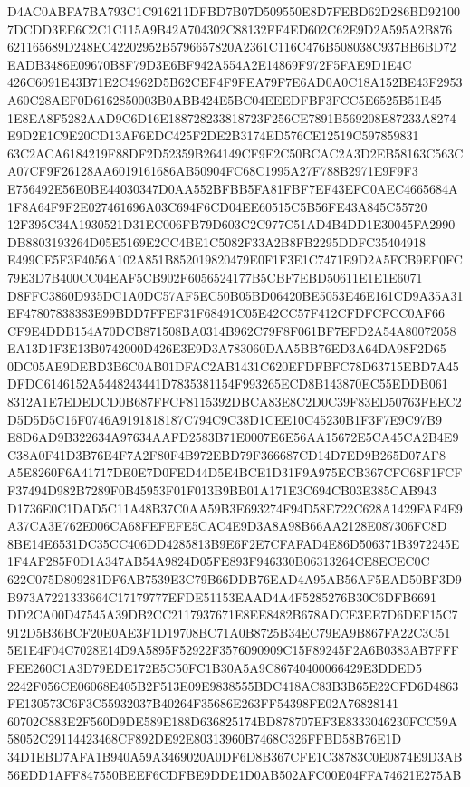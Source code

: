 \documentclass[UTF8,fontset=fandol,zihao=-4,a4paper]{ctexart}
\begin{document}
{{D4AC0ABFA7BA793C1C916211DFBD7B07D509550E8D7FEBD62D286BD921007DCDD3EE6C2C1C115A9B42A704302C88132FF4ED602C62E9D2A595A2B876
621165689D248EC42202952B5796657820A2361C116C476B508038C937BB6BD72EADB3486E09670B8F79D3E6BF942A554A2E14869F972F5FAE9D1E4C
426C6091E43B71E2C4962D5B62CEF4F9FEA79F7E6AD0A0C18A152BE43F2953A60C28AEF0D6162850003B0ABB424E5BC04EEEDFBF3FCC5E6525B51E45
1E8EA8F5282AAD9C6D16E188728233818723F256CE7891B569208E87233A8274E9D2E1C9E20CD13AF6EDC425F2DE2B3174ED576CE12519C597859831
63C2ACA6184219F88DF2D52359B264149CF9E2C50BCAC2A3D2EB58163C563CA07CF9F26128AA6019161686AB50904FC68C1995A27F788B2971E9F9F3
E756492E56E0BE44030347D0AA552BFBB5FA81FBF7EF43EFC0AEC4665684A1F8A64F9F2E027461696A03C694F6CD04EE60515C5B56FE43A845C55720
12F395C34A1930521D31EC006FB79D603C2C977C51AD4B4DD1E30045FA2990DB8803193264D05E5169E2CC4BE1C5082F33A2B8FB2295DDFC35404918
E499CE5F3F4056A102A851B852019820479E0F1F3E1C7471E9D2A5FCB9EF0FC79E3D7B400CC04EAF5CB902F6056524177B5CBF7EBD50611E1E1E6071
D8FFC3860D935DC1A0DC57AF5EC50B05BD06420BE5053E46E161CD9A35A31EF47807838383E99BDD7FFEF31F68491C05E42CC57F412CFDFCFCC0AF66
CF9E4DDB154A70DCB871508BA0314B962C79F8F061BF7EFD2A54A80072058EA13D1F3E13B0742000D426E3E9D3A783060DAA5BB76ED3A64DA98F2D65
0DC05AE9DEBD3B6C0AB01DFAC2AB1431C620EFDFBFC78D63715EBD7A45DFDC6146152A5448243441D7835381154F993265ECD8B143870EC55EDDB061
8312A1E7EDEDCD0B687FFCF8115392DBCA83E8C2D0C39F83ED50763FEEC2D5D5D5C16F0746A9191818187C794C9C38D1CEE10C45230B1F3F7E9C97B9
E8D6AD9B322634A97634AAFD2583B71E0007E6E56AA15672E5CA45CA2B4E9C38A0F41D3B76E4F7A2F80F4B972EBD79F366687CD14D7ED9B265D07AF8
A5E8260F6A41717DE0E7D0FED44D5E4BCE1D31F9A975ECB367CFC68F1FCFF37494D982B7289F0B45953F01F013B9BB01A171E3C694CB03E385CAB943
D1736E0C1DAD5C11A48B37C0AA59B3E693274F94D58E722C628A1429FAF4E9A37CA3E762E006CA68FEFEFE5CAC4E9D3A8A98B66AA2128E087306FC8D
8BE14E6531DC35CC406DD4285813B9E6F2E7CFAFAD4E86D506371B3972245E1F4AF285F0D1A347AB54A9824D05FE893F946330B06313264CE8ECEC0C
622C075D809281DF6AB7539E3C79B66DDB76EAD4A95AB56AF5EAD50BF3D9B973A7221333664C17179777EFDE51153EAAD4A4F5285276B30C6DFB6691
DD2CA00D47545A39DB2CC2117937671E8EE8482B678ADCE3EE7D6DEF15C7912D5B36BCF20E0AE3F1D19708BC71A0B8725B34EC79EA9B867FA22C3C51
5E1E4F04C7028E14D9A5895F52922F3576090909C15F89245F2A6B0383AB7FFFFEE260C1A3D79EDE172E5C50FC1B30A5A9C86740400066429E3DDED5
2242F056CE06068E405B2F513E09E9838555BDC418AC83B3B65E22CFD6D4863FE130573C6F3C55932037B40264F35686E263FF54398FE02A76828141
60702C883E2F560D9DE589E188D636825174BD878707EF3E8333046230FCC59A58052C29114423468CF892DE92E80313960B7468C326FFBD58B76E1D
34D1EBD7AFA1B940A59A3469020A0DF6D8B367CFE1C38783C0E0874E9D3AB56EDD1AFF847550BEEF6CDFBE9DDE1D0AB502AFC00E04FFA74621E275AB
}}
\end{document}
